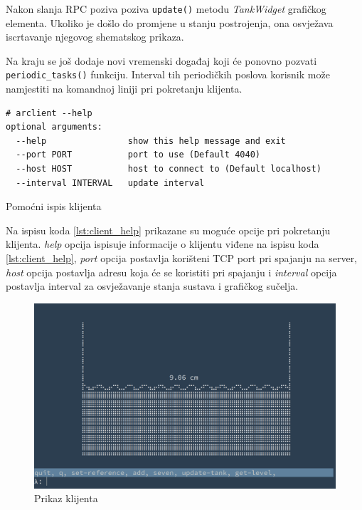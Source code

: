 Nakon slanja RPC poziva poziva \texttt{update()} metodu
\emph{TankWidget} grafičkog elementa. Ukoliko je došlo do promjene u stanju
postrojenja, ona osvježava iscrtavanje njegovog shematskog prikaza.

Na kraju se još dodaje novi vremenski događaj koji će ponovno pozvati
\texttt{periodic_tasks()} funkciju. Interval tih periodičkih
poslova korisnik može namjestiti na
komandnoj liniji pri pokretanju klijenta.

\begin{listing}[H]
\centering
\begin{verbatim}
# arclient --help
optional arguments:
  --help                show this help message and exit
  --port PORT           port to use (Default 4040)
  --host HOST           host to connect to (Default localhost)
  --interval INTERVAL   update interval
\end{verbatim}
\caption{Pomoćni ispis klijenta}
\label{lst:client_help}
\end{listing}

Na ispisu koda \ref{lst:client_help} prikazane su moguće opcije pri pokretanju
klijenta. \emph{help} opcija ispisuje informacije o klijentu viđene na ispisu
koda \ref{lst:client_help}, \emph{port} opcija postavlja korišteni TCP port pri
spajanju na server, \emph{host} opcija postavlja adresu koja će se koristiti pri
spajanju i \emph{interval} opcija postavlja interval za osvježavanje stanja
sustava i grafičkog sučelja.

\begin{figure}[H]
\centering
\includegraphics[scale=0.25]{figures/arclient-2.png}
\caption{Prikaz klijenta}
\label{fig:client}
\end{figure}

